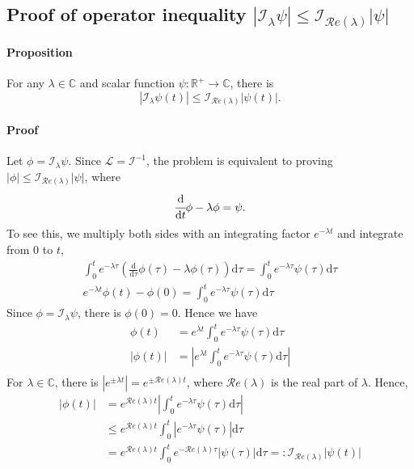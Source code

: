 \documentclass[accepted]{uai2023}
\newcommand{\dt}[1]{\cfrac{\mathrm{d} #1}{\mathrm{d} t}}
\renewcommand{\L}{\mathcal{L}}
\newcommand{\I}{\mathcal{I}}
\renewcommand{\Re}[1]{\mathcal{R}e\left(#1\right)}
\begin{document}
\subsection{Proof of operator inequality $|\I_\lambda \psi| \leq \I_{\Re{\lambda}}|\psi|$}
    \paragraph{Proposition} For any $\lambda \in \mathbb{C}$ and scalar function $\psi: \mathbb{R}^{+} \to \mathbb{C}$, there is 
    \begin{equation}\label{eq:operator-I-inequality}
        |\I_\lambda \psi(t)| \leq \I_{\Re{\lambda}}|\psi(t)|.
    \end{equation}
    \paragraph{Proof} 
    Let $\phi = \I_\lambda \psi$. Since $\L = \I^{-1}$, the problem is equivalent to proving $|\phi| \leq \I_{\Re{\lambda}}|\psi|$, where
    \begin{equation}
        \dt{}\phi-\lambda\phi = \psi.
    \end{equation}
    To see this, we multiply both sides with an integrating factor $e^{-\lambda t}$ and integrate from $0$ to $t$,
    \begin{gather}
        \int_{0}^{t} e^{-\lambda \tau} \left(\frac{\mathrm{d}}{\mathrm{d}\tau}\phi(\tau)-\lambda\phi(\tau)\right)\mathrm{d}\tau = \int_{0}^{t} e^{-\lambda \tau}\psi(\tau) \mathrm{d}\tau\\
        e^{-\lambda t}\phi(t) - \phi(0) = \int_{0}^{t} e^{-\lambda \tau}\psi(\tau) \mathrm{d}\tau
    \end{gather}
    Since $\phi = \I_{\lambda} \psi$, there is $\phi(0) = 0$. Hence we have
    \begin{align}
        \phi(t) &= e^{\lambda t}\int_{0}^{t} e^{-\lambda \tau}\psi(\tau) \mathrm{d}\tau \\
        |\phi(t)| &= \left|e^{\lambda t}\int_{0}^{t} e^{-\lambda \tau}\psi(\tau) \mathrm{d}\tau\right| \\
    \end{align}
    For $\lambda \in \mathbb{C}$, there is $\left|e^{\pm \lambda t}\right| = e^{\pm \Re{\lambda} t}$, where $\Re{\lambda}$ is the real part of $\lambda$.
    Hence,
    \begin{align}
        |\phi(t)| &= e^{\Re{\lambda} t} \left|\int_{0}^{t} e^{-\lambda \tau}\psi(\tau) \mathrm{d}\tau \right| \\
        &\leq e^{\Re{\lambda} t} \int_{0}^{t} \left|e^{-\lambda \tau}\psi(\tau) \right|\mathrm{d}\tau  \\
        &=e^{\Re{\lambda} t} \int_{0}^{t} e^{-\Re{\lambda} \tau}|\psi(\tau)|\mathrm{d}\tau =: \I_{\Re{\lambda}}|\psi(t)|
    \end{align}
\end{document}
